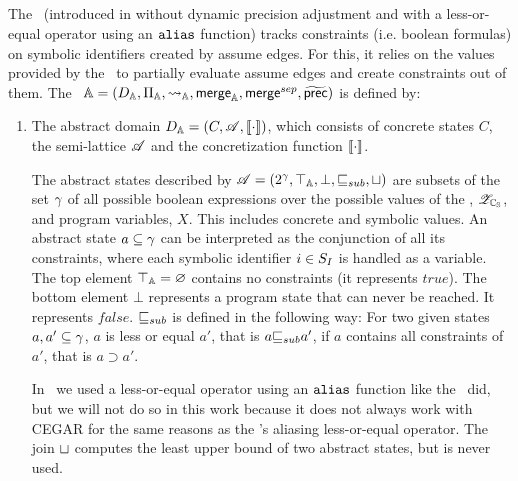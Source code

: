 \subsection{\ConstraintsCPA} \label{sec:constraintsCPA}
The \constraintsCPA\
(introduced in \cite{Lemberger2015} without dynamic precision adjustment and with a less-or-equal operator using an $\texttt{alias}$ function)
tracks constraints (i.e. boolean formulas) on symbolic identifiers created by assume edges.
For this, it relies on the values provided by the \symbolicValueAnalysisCPA\ to partially evaluate assume edges and create constraints out of them.
The \constraintsCPA\ $\mathbb{A} = (D_{\mathbb{A}}, \Pi_{\mathbb{A}}, \rightsquigarrow_{\mathbb{A}}, \operatorname{\operatorname{\mathsf{merge}}}_{\mathbb{A}}, \operatorname{\operatorname{\mathsf{merge}}}^{sep}, \operatorname{\widetilde{\operatorname{\operatorname{\mathsf{prec}}}}})$ is defined by:
\begin{enumerate}[leftmargin=*,label=\arabic*.]
\item The abstract domain $D_{\mathbb{A}} = (C, \mathscr{A}, \llbracket \cdot \rrbracket)$,
	which consists of concrete states $C$, the semi-lattice $\mathscr{A}$ and the concretization function $\llbracket \cdot \rrbracket$.
	
	The abstract states described by $\mathscr{A} = (2^\gamma, \top_{\mathbb{A}}, \bot, {\sqsubseteq_{sub}}, \sqcup)$ are subsets of the set $\gamma$ of all possible boolean expressions over the possible values of the \symbolicValueAnalysisCPA, ${\mathscr{Z}_{\mathbb{C_{S}}}}$, and program variables, $X$. This includes concrete and symbolic values. An abstract state $a \subseteq \gamma$ can be interpreted as the conjunction of all its constraints, where each symbolic identifier $i \in S_I$ is handled as a variable.
	The top element $\top_{\mathbb{A}} = \varnothing$ contains no constraints (it represents $true$). The bottom element $\bot$ represents a program state that can never be reached. It represents $false$.
${\sqsubseteq_{sub}}$ is defined in the following way:
For two given states $a, a' \subseteq \gamma$, $a$ is less or equal $a'$, that is $a {\sqsubseteq_{sub}} a'$, if $a$ contains all constraints of $a'$, that is $a \supset a'$.

In \cite{Lemberger2015}\ we used a less-or-equal operator using an $\texttt{alias}$ function like the \symbolicValueAnalysisCPA\ did, but we will not do so in this work because it does not always work with CEGAR for the same reasons as the \symbolicValueAnalysisCPA's aliasing less-or-equal operator.
	The join $\sqcup$ computes the least upper bound of two abstract states, but is never used.


\end{enumerate}
